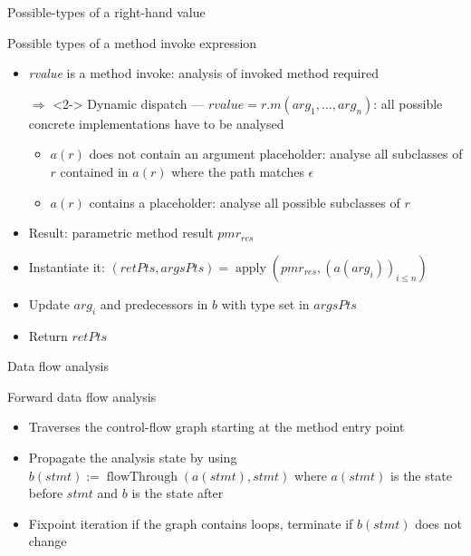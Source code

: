 \documentclass{beamer}
\begin{document}
\begin{frame}{Possible-types of a right-hand value}
\begin{block}{Possible types of a method invoke expression}
\begin{itemize}
\item \emph{rvalue} is a method invoke: analysis of invoked method required
\item[$\Rightarrow$]<2-> Dynamic dispatch --- $rvalue = r.m(arg_1, ...,arg_n)$: all possible concrete implementations have to be analysed
\begin{itemize}
\item $a(r)$ does not contain an argument placeholder: analyse all subclasses of $r$ contained in $a(r)$ where the path matches $\epsilon$
\item $a(r)$ contains a placeholder: analyse all possible subclasses of $r$
\end{itemize}
\item<3-> Result: parametric method result $pmr_{res}$
\item<4-> Instantiate it: $(retPts, argsPts) = \operatorname{apply}(pmr_{res}, (a(arg_i))_{i \le n})$
\item<5-> Update $arg_i$ and predecessors in $b$ with type set in $argsPts$
\item<5-> Return $retPts$
\end{itemize}
\end{block}
\end{frame}

\begin{frame}{Data flow analysis}
\begin{block}{Forward data flow analysis}
\begin{itemize}
\item Traverses the control-flow graph starting at the method entry point
\item Propagate the analysis state by using $b(stmt) := \operatorname{flowThrough}(a(stmt), stmt)$ where $a(stmt)$ is the state before $stmt$ and $b$ is the state after
\item Fixpoint iteration if the graph contains loops, terminate if $b(stmt)$ does not change
\end{itemize}
\end{block}
\end{frame}
\end{document}
